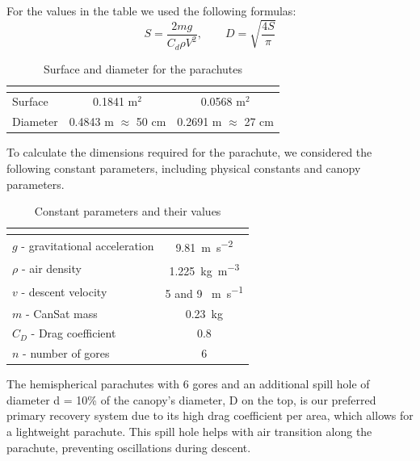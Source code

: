 For the values in the table we used the following formulas:
\begin{equation}\label{eq1}
S=\frac{2mg}{C_d \rho V^2}, \quad\quad D = \sqrt{\frac{4S}{\pi}}
\end{equation}

\begin{table}[htbp]
\centering
{}
\begin{tabular}{>{\centering\arraybackslash}lcc}
\rowcolor{DeepSkyBlue4}
\hline
\textbf{\color{white!50}{Parameter}} & \multicolumn{1}{|c|}{\textbf{\color{white!50}{1st Parachute}}}  & \textbf{\color{white!50}{2nd Parachute}} \\
\hline
Surface & 0.1841 m$^{2}$ & 0.0568 m$^{2}$\\
Diameter & 0.4843 m $\approx$ 50 cm & 0.2691 m $\approx$ 27 cm \\
\hline
\end{tabular}
\caption{Surface and diameter for the parachutes}
\end{table}


To calculate the dimensions required for the parachute, we considered the following constant parameters, including physical constants and canopy parameters.

\begin{table}[htbp]
\centering
{}
\begin{tabular}{>{\centering\arraybackslash}lc}
\rowcolor{DeepSkyBlue4}
\hline
\multicolumn{1}{|c|}{\textbf{\color{white!50}{Parameter}}}  & \textbf{\color{white!50}{Value}} \\
\hline
$g$ - gravitational acceleration & \SI{9.81 }{\meter\per\square\second} \\
\rowcolor{LightCyan1!50}$\rho$ - air density & \SI{1.225}{\kilogram\per\cubic\metre} \\
$v$ - descent velocity & 5 and 9 \SI{}{\meter\per\second} \\
\rowcolor{LightCyan1!50}$m$ - CanSat mass & \SI{0.23}{\kilogram} \\
$C_D$ - Drag coefficient & 0.8 \\
\rowcolor{LightCyan1!50}$n$ - number of gores & 6 \\
\hline
\end{tabular}
\caption{Constant parameters and their values}
\end{table}


The hemispherical parachutes with 6 gores and an additional spill hole of diameter d = 10\% of the canopy’s diameter, D on the top, is our preferred primary recovery system due to its high drag coefficient per area, which allows for a lightweight parachute. This spill hole helps with air transition along the parachute, preventing oscillations during descent.


